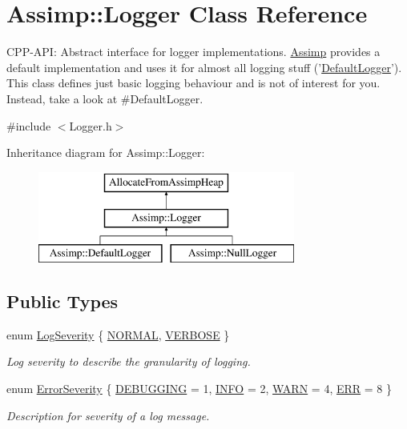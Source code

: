 \hypertarget{class_assimp_1_1_logger}{\section{Assimp\-:\-:Logger Class Reference}
\label{class_assimp_1_1_logger}
}


C\-P\-P-\/\-A\-P\-I\-: Abstract interface for logger implementations. \hyperlink{namespace_assimp}{Assimp} provides a default implementation and uses it for almost all logging stuff ('\hyperlink{class_assimp_1_1_default_logger}{Default\-Logger}'). This class defines just basic logging behaviour and is not of interest for you. Instead, take a look at \#\-Default\-Logger.  




{\ttfamily \#include $<$Logger.\-h$>$}

Inheritance diagram for Assimp\-:\-:Logger\-:\begin{figure}[H]
\begin{center}
\leavevmode
\includegraphics[height=3.000000cm]{class_assimp_1_1_logger}
\end{center}
\end{figure}
\subsection*{Public Types}
\begin{DoxyCompactItemize}
\item 
enum \hyperlink{class_assimp_1_1_logger_a8b6248a0fd062431e8572556350d29e6}{Log\-Severity} \{ \hyperlink{class_assimp_1_1_logger_a8b6248a0fd062431e8572556350d29e6a79d16f85dc21486ee489f300027e8eda}{N\-O\-R\-M\-A\-L}, 
\hyperlink{class_assimp_1_1_logger_a8b6248a0fd062431e8572556350d29e6afc9d1d86aa82fdb80e00c99b3c1ce486}{V\-E\-R\-B\-O\-S\-E}
 \}
\begin{DoxyCompactList}\small\item\em Log severity to describe the granularity of logging. \end{DoxyCompactList}\item 
enum \hyperlink{class_assimp_1_1_logger_acd0b52a87d6fc11e957ed2c6e2ad75b6}{Error\-Severity} \{ \hyperlink{class_assimp_1_1_logger_acd0b52a87d6fc11e957ed2c6e2ad75b6a1c233dd8bb46dc4386948a03877b8160}{D\-E\-B\-U\-G\-G\-I\-N\-G} = 1, 
\hyperlink{class_assimp_1_1_logger_acd0b52a87d6fc11e957ed2c6e2ad75b6a5631a164f078d5f7e8780cf88d1d45d6}{I\-N\-F\-O} = 2, 
\hyperlink{class_assimp_1_1_logger_acd0b52a87d6fc11e957ed2c6e2ad75b6abea27a64e7f7cc758549526f953c26f2}{W\-A\-R\-N} = 4, 
\hyperlink{class_assimp_1_1_logger_acd0b52a87d6fc11e957ed2c6e2ad75b6a2dd325191d60507ab0afd01ea3add8d1}{E\-R\-R} = 8
 \}
\begin{DoxyCompactList}\small\item\em Description for severity of a log message. \end{DoxyCompactList}\end{DoxyCompactItemize}
